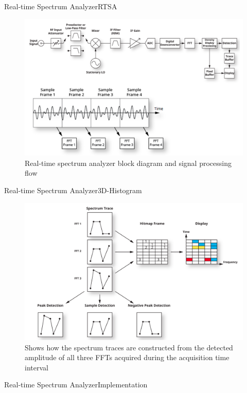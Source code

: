 \begin{frame}{Real-time Spectrum Analyzer}{RTSA}
	\begin{figure}
		\centering
		\includegraphics[scale=0.7]{graphics/rtsa_fig3.png}
		\caption{Real-time spectrum analyzer block diagram and signal processing flow}
	\end{figure}
\end{frame}
\begin{frame}{Real-time Spectrum Analyzer}{3D-Histogram}
	\begin{figure}
		\centering
		\includegraphics[scale=0.85]{graphics/rtsa_fig4.png}
		\caption{Shows how the spectrum traces are constructed from the detected
			amplitude of all three FFTs acquired during the acquisition time interval}
	\end{figure}
\end{frame}
\begin{frame}{Real-time Spectrum Analyzer}{Implementation}

\end{frame}






